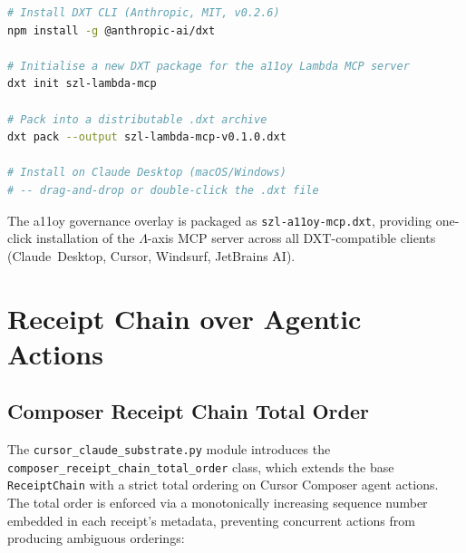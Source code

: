\begin{lstlisting}[language=bash, caption={DXT packaging workflow},
  label={lst:dxt-workflow}]
# Install DXT CLI (Anthropic, MIT, v0.2.6)
npm install -g @anthropic-ai/dxt

# Initialise a new DXT package for the a11oy Lambda MCP server
dxt init szl-lambda-mcp

# Pack into a distributable .dxt archive
dxt pack --output szl-lambda-mcp-v0.1.0.dxt

# Install on Claude Desktop (macOS/Windows)
# -- drag-and-drop or double-click the .dxt file
\end{lstlisting}

The a11oy governance overlay is packaged as \texttt{szl-a11oy-mcp.dxt},
providing one-click installation of the \(\Lambda\)-axis MCP server across
all DXT-compatible clients (Claude~Desktop, Cursor, Windsurf, JetBrains AI).

\section{Receipt Chain over Agentic Actions}
\label{sec:receipt-agentic}

\subsection{Composer Receipt Chain Total Order}
\label{ssec:composer-receipt-chain}

The \texttt{cursor\_claude\_substrate.py} module introduces the
\texttt{composer\_receipt\_chain\_total\_order} class, which extends the
base \texttt{ReceiptChain} with a strict total ordering on Cursor Composer
agent actions.  The total order is enforced via a monotonically increasing
sequence number embedded in each receipt's metadata, preventing concurrent
actions from producing ambiguous orderings:

